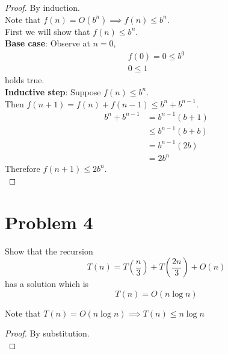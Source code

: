 \documentclass{article}
\begin{document}
\begin{proof}
    By induction. \\
    Note that \(f(n) = O(b^n) \implies f(n) \leq b^n\). \\
    First we will show that \(f(n) \leq b^n\). \\
    \textbf{Base case}: Observe at \(n = 0\),
    \begin{align*}
        f(0) = 0 \leq b^0 \\
        0 \leq 1
    \end{align*}
    holds true. \\
    \textbf{Inductive step}: Suppose \(f(n) \leq b^n\). \\
    Then \(f(n+1) = f(n) + f(n-1) \leq b^n + b^{n-1}\). \\
    \begin{align*}
        b^n + b^{n-1} & = b^{n-1}(b+1) \\
                      & \leq b^{n-1}(b+b) \\
                      & = b^{n-1}(2b) \\
                      & = 2b^n
    \end{align*}
    Therefore \(f(n+1) \leq 2b^n\). \\
\end{proof}

\pagebreak

\section*{Problem 4}
Show that the recursion
\begin{equation*}
    T(n) = T(\frac{n}{3}) + T(\frac{2n}{3}) + O(n)
\end{equation*}
has a solution which is
\begin{equation*}
    T(n) = O(n \log n)
\end{equation*}

Note that \(T(n) = O(n \log n) \implies T(n) \leq n \log n\) \\
\begin{proof}
    By substitution. \\
\end{proof}
\end{document}
